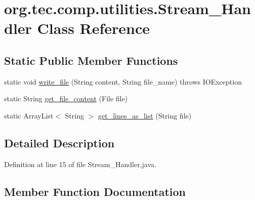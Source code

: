 \hypertarget{classorg_1_1tec_1_1comp_1_1utilities_1_1_stream___handler}{}\section{org.\+tec.\+comp.\+utilities.\+Stream\+\_\+\+Handler Class Reference}
\label{classorg_1_1tec_1_1comp_1_1utilities_1_1_stream___handler}
\subsection*{Static Public Member Functions}
\begin{DoxyCompactItemize}
\item 
static void \mbox{\hyperlink{classorg_1_1tec_1_1comp_1_1utilities_1_1_stream___handler_a4c8174395de27fa9a19e1e53728590ce}{write\+\_\+file}} (String content, String file\+\_\+name)  throws I\+O\+Exception 
\item 
static String \mbox{\hyperlink{classorg_1_1tec_1_1comp_1_1utilities_1_1_stream___handler_a5bf157858de1626cb140877ec593ab0e}{get\+\_\+file\+\_\+content}} (File file)
\item 
static Array\+List$<$ String $>$ \mbox{\hyperlink{classorg_1_1tec_1_1comp_1_1utilities_1_1_stream___handler_a636a8d7d75a5728ffc271d4178124e3f}{get\+\_\+lines\+\_\+as\+\_\+list}} (String file)
\end{DoxyCompactItemize}


\subsection{Detailed Description}


Definition at line 15 of file Stream\+\_\+\+Handler.\+java.



\subsection{Member Function Documentation}
\mbox{\label{classorg_1_1tec_1_1comp_1_1utilities_1_1_stream___handler_a5bf157858de1626cb140877ec593ab0e}} 
